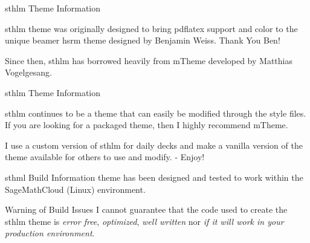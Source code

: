 \documentclass[newPxFont,numfooter,sectionpages]{beamer}
\begin{document}
    
    \begin{frame}[c]{sthlm Theme Information}
    
    \alert{sthlm} theme was originally designed to bring pdflatex support and color to the unique beamer \alert{hsrm} theme designed by Benjamin Weiss.  Thank You Ben!   
    
    \begin{center}
    \end{center}
    
    Since then, \alert{sthlm} has borrowed heavily from \alert{mTheme} developed by Matthias Vogelgesang.  
    
    \end{frame}
    
    
    
    \begin{frame}[c]{sthlm Theme Information}
        
    \alert{sthlm} continues to be a theme that can easily be modified through the style files.  If you are looking for a packaged theme, then I highly recommend \alert{mTheme}.\\
    
    \vspace{1em}
    
    I use a custom version of \alert{sthlm} for daily decks and make a vanilla version of the theme available for others to use and modify. - Enjoy!
    
    \end{frame}
    
    
    \begin{frame}[c]{sthml Build Information}
     theme has been designed and tested to work within the SageMathCloud (Linux) environment.\\
    
    \vspace{1em}
    
    \begin{alertblock}{Warning of Build Issues}
    I cannot guarantee that the code used to create the sthlm theme is \emph{error free}, \emph{optimized}, \emph{well written} nor \emph{if it will work in your production environment}.
    \end{alertblock}
    
    
    \end{frame}
    
\end{document}
